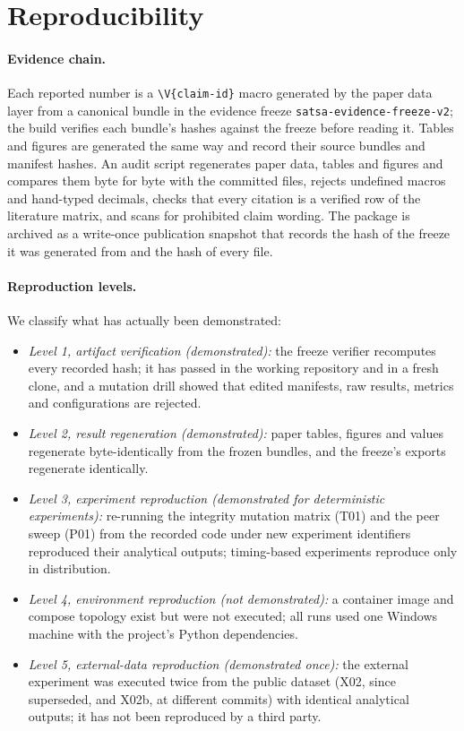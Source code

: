 \section{Reproducibility}
\label{sec:repro}

\paragraph{Evidence chain.}
Each reported number is a \verb|\V{claim-id}| macro generated by the paper data
layer from a canonical bundle in the evidence freeze
\texttt{satsa-evidence-freeze-v2}; the build verifies each bundle's hashes against
the freeze before reading it. Tables and figures are generated the same way and
record their source bundles and manifest hashes. An audit script regenerates paper
data, tables and figures and compares them byte for byte with the committed files,
rejects undefined macros and hand-typed decimals, checks that every citation is a
verified row of the literature matrix, and scans for prohibited claim wording.
The package is archived as a write-once publication snapshot that records the
hash of the freeze it was generated from and the hash of every file.

\paragraph{Reproduction levels.}
We classify what has actually been demonstrated:
\begin{itemize}
\item \emph{Level 1, artifact verification (demonstrated):} the freeze verifier
  recomputes every recorded hash; it has passed in the working repository and in a
  fresh clone, and a mutation drill showed that edited manifests, raw results,
  metrics and configurations are rejected.
\item \emph{Level 2, result regeneration (demonstrated):} paper tables, figures and
  values regenerate byte-identically from the frozen bundles, and the freeze's
  exports regenerate identically.
\item \emph{Level 3, experiment reproduction (demonstrated for deterministic
  experiments):} re-running the integrity mutation matrix (T01) and the peer sweep
  (P01) from the recorded code under new experiment identifiers reproduced their
  analytical outputs; timing-based experiments reproduce only in distribution.
\item \emph{Level 4, environment reproduction (not demonstrated):} a container
  image and compose topology exist but were not executed; all runs used one
  Windows machine with the project's Python dependencies.
\item \emph{Level 5, external-data reproduction (demonstrated once):} the external
  experiment was executed twice from the public dataset (X02, since superseded, and X02b, at different
  commits) with identical analytical outputs; it has not been reproduced by a third
  party.
\end{itemize}

